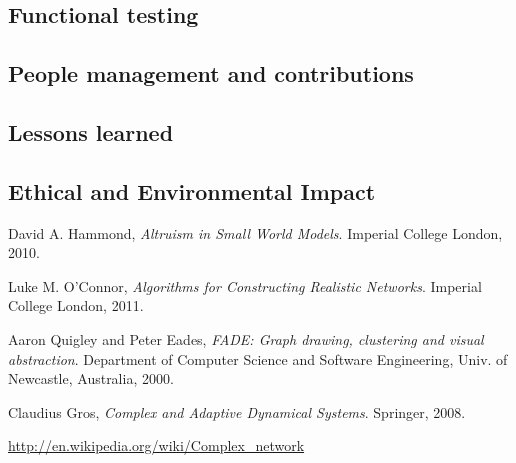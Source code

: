 \documentclass[a4paper,11pt,titlepage]{article}
\begin{document}


\subsection{Functional testing}
\label{tests}




\subsection{People management and contributions}

\subsection{Lessons learned}


\subsection{Ethical and Environmental Impact}

\begin{thebibliography}{9}

  David A. Hammond,
  \emph{Altruism in Small World Models}.
  Imperial College London,
  2010.

  Luke M. O'Connor,
  \emph{Algorithms for Constructing Realistic Networks}.
  Imperial College London,
  2011.

  Aaron Quigley and Peter Eades,
  \emph{FADE: Graph drawing, clustering and visual abstraction}.
  Department of Computer Science and Software Engineering,
  Univ. of  Newcastle, Australia, 2000.

Claudius Gros,
\emph{Complex and Adaptive Dynamical Systems}.
Springer,
2008.

  \url{http://en.wikipedia.org/wiki/Complex_network}

\end{thebibliography}
\end{document}
